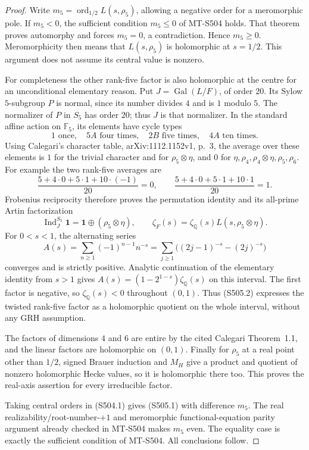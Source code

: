 \begin{proof}
Write $m_5=\operatorname{ord}_{1/2}L(s,\rho_5)$,
allowing a negative order for a meromorphic pole.
If $m_5<0$, the sufficient condition $m_5\le0$
of MT-S504 holds. That theorem proves automorphy
and forces $m_5=0$, a contradiction. Hence $m_5\ge0$.
Meromorphicity then means that $L(s,\rho_5)$
is holomorphic at $s=1/2$. This argument does
not assume its central value is nonzero.

For completeness the other rank-five factor
is also holomorphic at the centre for an
unconditional elementary reason. Put
$J=\operatorname{Gal}(L/F)$, of order $20$.
Its Sylow $5$-subgroup $P$ is normal, since
its number divides $4$ and is $1$ modulo $5$.
The normalizer of $P$ in $S_5$ has order $20$;
thus $J$ is that normalizer. In the standard
affine action on $\mathbb F_5$, its elements
have cycle types
\[
       1\text{ once},\quad 5A\text{ four times},\quad
       2B\text{ five times},\quad 4A\text{ ten times}.
\]
Using Calegari's character table, arXiv:1112.1152v1,
p.~3, the average over these elements is $1$
for the trivial character and for $\rho_5\otimes\eta$,
and $0$ for $\eta,\rho_4,\rho_4\otimes\eta,\rho_5,\rho_6$.
For example the two rank-five averages are
\[
 \frac{5+4\cdot0+5\cdot1+10\cdot(-1)}{20}=0,
 \qquad
 \frac{5+4\cdot0+5\cdot1+10\cdot1}{20}=1.
\]
Frobenius reciprocity therefore proves the
permutation identity and its all-prime
Artin factorization
\[
 \operatorname{Ind}_{J}^{S_5}\mathbf1
          =\mathbf1\oplus(\rho_5\otimes\eta),\qquad
 \zeta_F(s)=\zeta_{\mathbb Q}(s)L(s,\rho_5\otimes\eta).
 \tag{S505.2}
\]
For $0<s<1$, the alternating series
\[
 A(s)=\sum_{n\ge1}(-1)^{n-1}n^{-s}
     =\sum_{j\ge1}\bigl((2j-1)^{-s}-(2j)^{-s}\bigr)
\]
converges and is strictly positive. Analytic continuation
of the elementary identity from $s>1$ gives
$A(s)=(1-2^{1-s})\zeta_{\mathbb Q}(s)$ on this interval.
The first factor is negative, so
$\zeta_{\mathbb Q}(s)<0$ throughout $(0,1)$.
Thus (S505.2) expresses the twisted rank-five
factor as a holomorphic quotient on the whole
interval, without any GRH assumption.

The factors of dimensions $4$ and $6$ are
entire by the cited Calegari Theorem~1.1,
and the linear factors are holomorphic
on $(0,1)$. Finally for $\rho_5$ at a
real point other than $1/2$, signed Brauer
induction and $M_H$ give a product and
quotient of nonzero holomorphic Hecke values,
so it is holomorphic there too.
This proves the real-axis assertion for
every irreducible factor.

Taking central orders in (S504.1) gives
(S505.1) with difference $m_5$. The real
realizability/root-number-$+1$ and
meromorphic functional-equation parity
argument already checked in MT-S504
makes $m_5$ even. The equality case is
exactly the sufficient condition of
MT-S504. All conclusions follow.
\end{proof}

